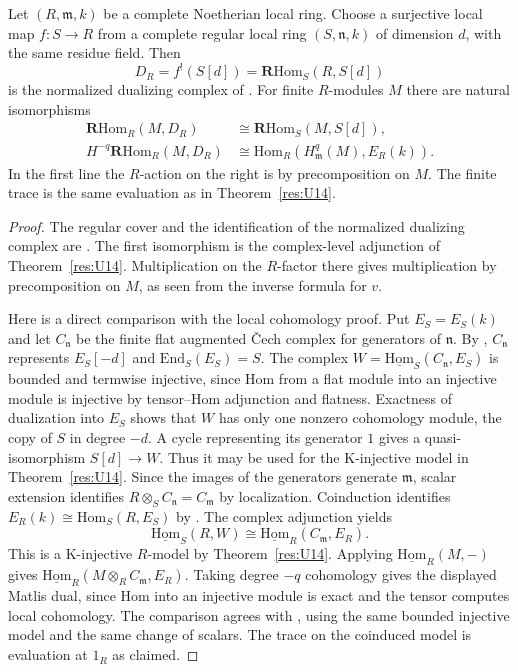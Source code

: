 \begin{theorem}\label{res:U19}
Let \((R,\mathfrak m,k)\) be a complete Noetherian local ring.
Choose a surjective local map \(f:S\to R\) from a complete
regular local ring \((S,\mathfrak n,k)\) of dimension \(d\),
with the same residue field. Then
\[
 D_R=f^!(S[d])=\mathbf R\mathrm{Hom}_S(R,S[d])
\]
is the normalized dualizing complex of
\cite[D05]{ca-topics}. For finite \(R\)-modules \(M\)
there are natural isomorphisms
\[
 \begin{split}
 \mathbf R\mathrm{Hom}_R(M,D_R)
      &\cong \mathbf R\mathrm{Hom}_S(M,S[d]),\\
 H^{-q}\mathbf R\mathrm{Hom}_R(M,D_R)
      &\cong \mathrm{Hom}_R(H^q_{\mathfrak m}(M),E_R(k)).
 \end{split}
\]
In the first line the \(R\)-action on the right is by
precomposition on \(M\). The finite trace is the same
evaluation as in Theorem~\ref{res:U14}.
\end{theorem}
\begin{proof}
The regular cover and the identification of the normalized
dualizing complex are \cite[C04, D05]{ca-topics}.
The first isomorphism is the complex-level adjunction of
Theorem~\ref{res:U14}. Multiplication on the \(R\)-factor
there gives multiplication by precomposition on \(M\),
as seen from the inverse formula for \(v\).

Here is a direct comparison with the local cohomology
proof. Put \(E_S=E_S(k)\) and let \(C_{\mathfrak n}\)
be the finite flat augmented \v{C}ech complex for
generators of \(\mathfrak n\). By
\cite[L05, D01, M03]{ca-topics}, \(C_{\mathfrak n}\)
represents \(E_S[-d]\) and
\(\mathrm{End}_S(E_S)=S\).
The complex \(W=\underline{\mathrm{Hom}}_S(C_{\mathfrak n},E_S)\)
is bounded and termwise injective, since Hom from a flat
module into an injective module is injective by tensor--Hom
adjunction and flatness. Exactness of dualization into
\(E_S\) shows that \(W\) has only one nonzero cohomology
module, the copy of \(S\) in degree \(-d\). A cycle representing
its generator \(1\) gives a quasi-isomorphism \(S[d]\to W\).
Thus it may be used for the K-injective model in
Theorem~\ref{res:U14}. Since the images of the generators
generate \(\mathfrak m\), scalar extension identifies
\(R\otimes_S C_{\mathfrak n}=C_{\mathfrak m}\)
by localization. Coinduction identifies
\(E_R(k)\cong\mathrm{Hom}_S(R,E_S)\) by
\cite[D04]{ca-topics}. The complex adjunction yields
\[
 \underline{\mathrm{Hom}}_S(R,W)
    \cong \underline{\mathrm{Hom}}_R(C_{\mathfrak m},E_R).
\]
This is a K-injective \(R\)-model by Theorem~\ref{res:U14}.
Applying \(\underline{\mathrm{Hom}}_R(M,-)\) gives
\(\underline{\mathrm{Hom}}_R(M\otimes_R C_{\mathfrak m},E_R)\).
Taking degree \(-q\) cohomology gives the displayed Matlis
dual, since Hom into an injective module is exact and the
tensor computes local cohomology. The comparison agrees
with \cite[D06]{ca-topics}, using the same bounded
injective model and the same change of scalars. The trace
on the coinduced model is evaluation at \(1_R\) as claimed.
\end{proof}

